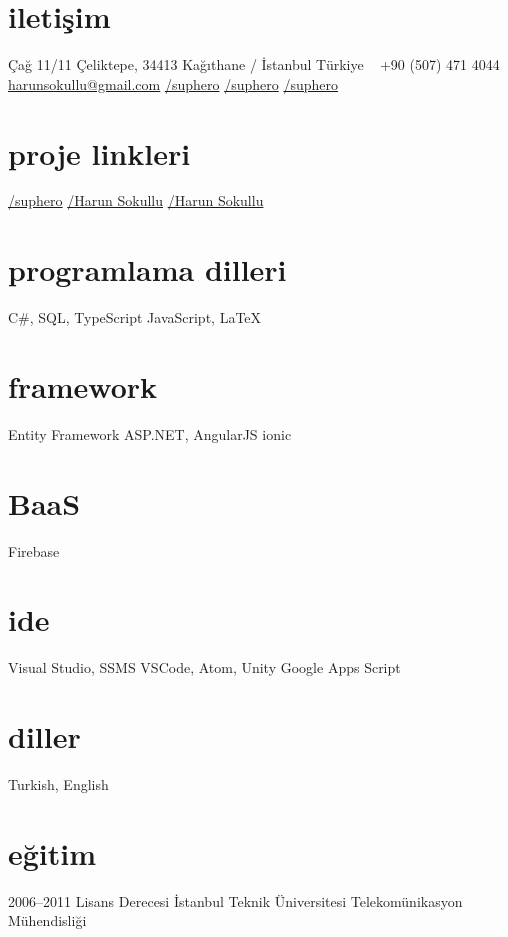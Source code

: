\documentclass[]{../friggeri-cv} %
\begin{document}

\begin{aside}
\section{iletişim}
Çağ 11/11
Çeliktepe, 34413
Kağıthane / İstanbul
Türkiye
~
+90 (507) 471 4044
~
\href{mailto:harunsokullu@gmail.com}{harunsokullu@gmail.com}
\href{https://www.linkedin.com/in/suphero}{\faLinkedin/suphero}
\href{https://www.facebook.com/suphero}{\faFacebook/suphero}
\href{https://twitter.com/suphero}{\faTwitter/suphero}
\section{proje linkleri}
\href{https://github.com/suphero}{\faGithub/suphero}
\href{https://play.google.com/store/apps/developer?id=Harun+Sokullu}{\faAndroid/Harun Sokullu}
\href{https://itunes.apple.com/tr/developer/harun-sokullu/id1265151811}{\faApple/Harun Sokullu}
\section{programlama dilleri}
C\#, SQL, TypeScript
JavaScript, \LaTeX
\section{framework}
Entity Framework
ASP.NET, AngularJS
ionic
\section{BaaS}
Firebase
\section{ide}
Visual Studio, SSMS 
VSCode, Atom, Unity
Google Apps Script
\section{diller}
Turkish, English
\end{aside}
\section{eğitim}

\begin{entrylist}

\entry
{2006--2011}
{Lisans {\normalfont Derecesi}}
{İstanbul Teknik Üniversitesi}
{Telekomünikasyon Mühendisliği}

\end{entrylist}
\end{document}
